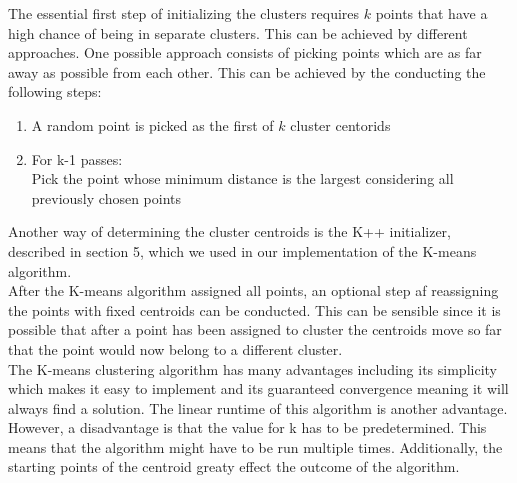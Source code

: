 The essential first step of initializing the clusters requires $k$ points that have a high chance of being in separate clusters. This can be achieved by different approaches. One possible approach consists of picking points which are as far away as possible from each other. This can be achieved by the conducting the following steps:
\begin{enumerate}
	\item	A random point is picked as the first of $k$ cluster centorids
	\item	For k-1 passes: \\
	Pick the point whose minimum distance is the largest considering all previously chosen points
	
\end{enumerate}
Another way of determining the cluster centroids is the K++ initializer, described in section 5, which we used in our implementation of the K-means algorithm.\\
After the K-means algorithm assigned all points, an optional step af reassigning the points with fixed centroids can be conducted. This can be sensible since it is possible that after a point has been assigned to cluster the centroids move so far that the point would now belong to a different cluster.\\
The K-means clustering algorithm has many advantages including its simplicity which makes it easy to implement and its guaranteed convergence meaning it will always find a solution. The linear runtime of this algorithm is another advantage. However, a disadvantage is that the value for k has to be predetermined. This means that the algorithm might have to be run multiple times. Additionally, the starting points of the centroid greaty effect the outcome of the algorithm.
